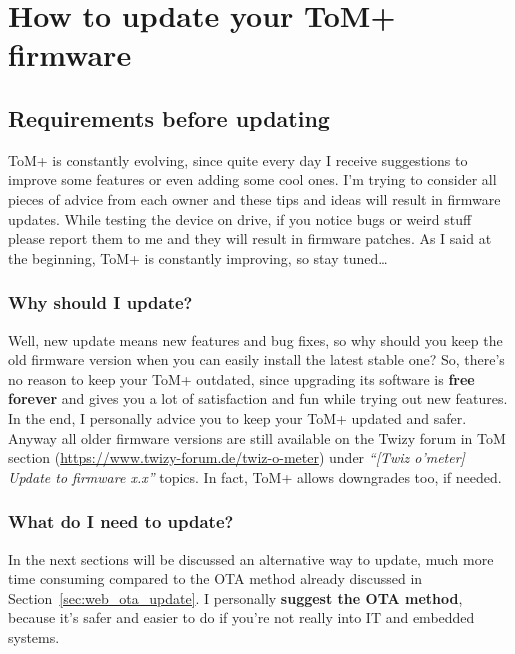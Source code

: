 \chapter{How to update your ToM+ firmware}
\label{sec:update_procedure}

\section{Requirements before updating}

ToM+ is constantly evolving, since quite every day I receive suggestions to improve
some features or even adding some cool ones. I'm trying to consider all pieces of
advice from each owner and these tips and ideas will result in firmware updates.
While testing the device on drive, if you notice bugs or weird stuff please report
them to me and they will result in firmware patches. As I said at the beginning,
ToM+ is constantly improving, so stay tuned\ldots

\subsection{Why should I update?}

Well, new update means new features and bug fixes, so why should you keep the old
firmware version when you can easily install the latest stable one? So, there's no
reason to keep your ToM+ outdated, since upgrading its software is \textbf{free forever}
and gives you a lot of satisfaction and fun while trying out new features. In the end, I personally
advice you to keep your ToM+ updated and safer.\\

Anyway all older firmware versions are still available on the Twizy forum in ToM section
(\url{https://www.twizy-forum.de/twiz-o-meter}) under \textit{“[Twiz o'meter] Update to
firmware x.x”} topics. In fact, ToM+ allows downgrades too, if needed.

\subsection{What do I need to update?}

In the next sections will be discussed an alternative way to update, much more
time consuming compared to the OTA method already discussed in Section~\ref{sec:web_ota_update}.
I personally \textbf{suggest the OTA method}, because it's safer and easier to do if you're not
really into IT and embedded systems.\\

